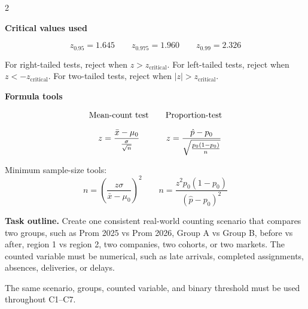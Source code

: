 \documentclass[12pt]{article}
\newcommand{\SubsectionBox}[1]{%
	\noindent\colorbox{gray!30}{%
		\parbox{\linewidth}{\textbf{#1}}%
	}\par\vspace{0.35cm}%
}
\begin{document}
	\begin{multicols}{2}
		
	\SubsectionBox{Critical values used}
	\vspace{-1cm}
	\[
	z_{0.95}=1.645
	\qquad
	z_{0.975}=1.960
	\qquad
	z_{0.99}=2.326
	\]
	
	For right-tailed tests, reject when \(z>z_{\text{critical}}\). For left-tailed tests, reject when \(z<-z_{\text{critical}}\). For two-tailed tests, reject when \(|z|>z_{\text{critical}}\).
	
	\vspace{0.25cm}
	
	\SubsectionBox{Formula tools}
	\vspace{-0.65cm}
	\[
	\begin{array}{c@{\qquad}c}
		\text{Mean-count test} & \text{Proportion-test} \\[0.35cm]
		z=\dfrac{\bar x-\mu_0}{\frac{\sigma}{\sqrt{n}}}
		&
		z=\dfrac{\hat p-p_0}{\sqrt{\frac{p_0(1-p_0)}{n}}}
	\end{array}
	\]
	
	Minimum sample-size tools:
	\[
	n=\left(\frac{z\sigma}{\bar x-\mu_0}\right)^2
	\qquad 
	n=\frac{z^2p_0(1-p_0)}{(\hat p-p_0)^2}
	\]
	
	\textbf{Task outline.} Create one consistent real-world counting scenario that compares two groups, such as Prom 2025 vs Prom 2026, Group A vs Group B, before vs after, region 1 vs region 2, two companies, two cohorts, or two markets. The counted variable must be numerical, such as late arrivals, completed assignments, absences, deliveries, or delays.
	
	The same scenario, groups, counted variable, and binary threshold must be used throughout C1--C7.\\
	

\end{multicols}
\end{document}
